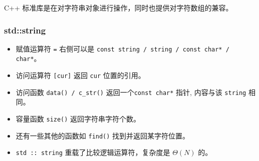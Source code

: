 C++ 标准库是在对字符串对象进行操作，同时也提供对字符数组的兼容。

\subsubsection{std::string}

\begin{itemize}
\item 赋值运算符 \texttt{=} 右侧可以是 \texttt{const string / string / const char* / char*}。
\item 访问运算符 \texttt{[cur]} 返回 \texttt{cur} 位置的引用。
\item 访问函数 \texttt{data() / c\_str()} 返回一个\texttt{const char*} 指针, 内容与该 \texttt{string} 相同。
\item 容量函数 \texttt{size()} 返回字符串字符个数。
\item 还有一些其他的函数如 \texttt{find()} 找到并返回某字符位置。
\item \texttt{std :: string} 重载了比较逻辑运算符，复杂度是 $\Theta(N)$ 的。
\end{itemize}
